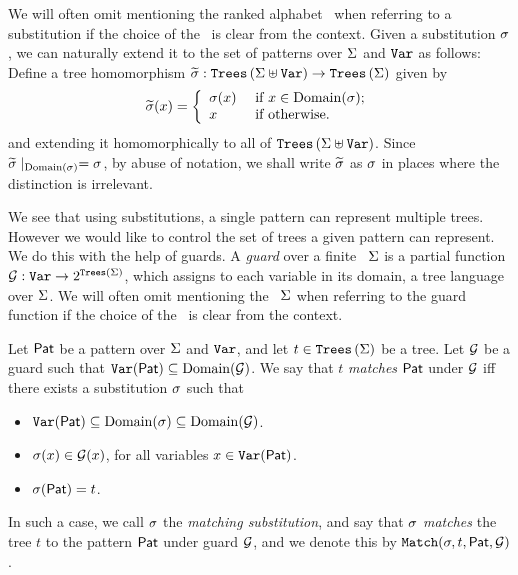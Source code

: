 We will often omit mentioning the ranked alphabet \rab\ when referring to a substitution if the choice of the \rab\ is clear from the context.
Given a substitution $\sigma$, we can naturally extend it to the set of patterns over $\Sigma$ and $\texttt{Var}$ as follows: Define a tree homomorphism $\widetilde{\sigma} : \texttt{Trees}\left(\Sigma \uplus \texttt{Var}\right) \to \texttt{Trees}\left(\Sigma\right)$ given by
\[ \widetilde{\sigma}(x) = \left\{ \begin{array}{ll} \sigma(x) & \mbox{ if } x \in \operatorname{Domain}(\sigma);\\ x & \mbox{ if } \mbox{otherwise}. \end{array} \right. \]
and extending it homomorphically to all of $\texttt{Trees}\left(\Sigma \uplus \texttt{Var}\right)$.
Since $\widetilde{\sigma} \mid_{\operatorname{Domain}(\sigma)} = \sigma$, by abuse of notation, we  shall write $\widetilde{\sigma}$ as $\sigma$ in places where the distinction is irrelevant.

We see that using substitutions, a single pattern can represent multiple trees. However we would like to control the set of trees a given pattern can represent. We do this with the help of guards. A \emph{guard} over a finite \rab\ $\Sigma$ is a partial function $\mathcal{G} : \texttt{Var} \to 2^{\texttt{Trees}\left(\Sigma\right)}$, which assigns to each variable in its domain, a tree language over $\Sigma$. We will often omit mentioning the \rab\ $\Sigma$ when referring to the guard function if the choice of the \rab\ is clear from the context.


\begin{definition}[Match]\label{def:match}
    Let $\mathsf{Pat}$ be a pattern over $\Sigma$ and $\texttt{Var}$, and let $t \in \texttt{Trees}\left(\Sigma\right)$ be a tree. Let $\mathcal{G}$ be a guard such that $\texttt{Var}(\mathsf{Pat}) \subseteq \operatorname{Domain}(\mathcal{G})$. We say that $t$ \emph{matches} $\mathsf{Pat}$ under $\mathcal{G}$ iff there exists a substitution $\sigma$ such that
    \begin{itemize}
        \item $\texttt{Var}(\mathsf{Pat}) \subseteq \operatorname{Domain}(\sigma) \subseteq \operatorname{Domain}(\mathcal{G})$.
        \item $\sigma(x) \in \mathcal{G}(x)$, for all variables $x \in \texttt{Var}(\mathsf{Pat})$.
        \item $\sigma(\mathsf{Pat}) = t$.
    \end{itemize}
    In such a case, we call $\sigma$ the \emph{matching substitution}, and say that $\sigma$ \emph{matches} the tree $t$ to the pattern $\mathsf{Pat}$ under guard $\mathcal{G}$, and we denote this by $\texttt{Match}(\sigma, t, \mathsf{Pat}, \mathcal{G})$.
\end{definition}

